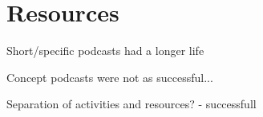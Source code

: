 
\section{Resources} %
\label{sec:resources}

Short/specific podcasts had a longer life

Concept podcasts were not as successful... 

Separation of activities and resources? - successfull






